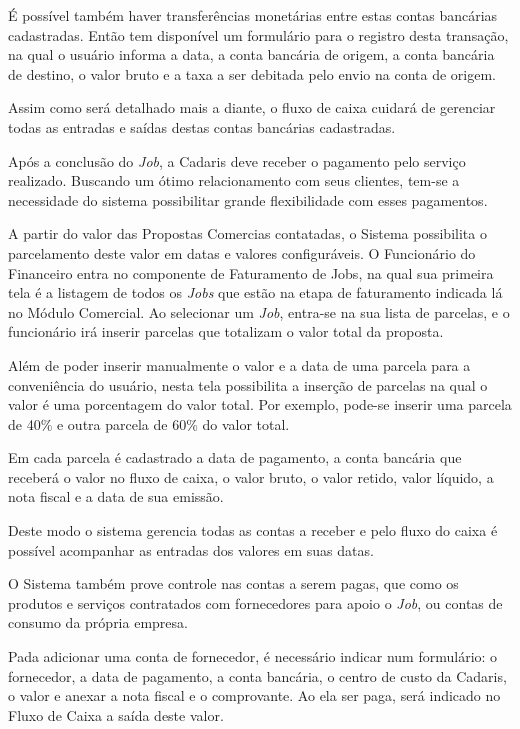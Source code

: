 \documentclass[
  12pt,				%
  openany,
  oneside,
  a4paper,			%
  english,			%
  brazil
]{article}
\numberwithin{figure}{section}
\numberwithin{table}{section}
\newcounter{subsubsubsection}[subsubsection]
\begin{document}
É possível também haver transferências monetárias entre estas contas bancárias cadastradas. Então tem disponível um formulário para o registro desta transação, na qual o usuário informa a data, a conta bancária de origem, a conta bancária de destino, o valor bruto e a taxa a ser debitada pelo envio na conta de origem.

Assim como será detalhado mais a diante, o fluxo de caixa cuidará de gerenciar todas as entradas e saídas destas contas bancárias cadastradas.



Após a conclusão do \textit{Job}, a Cadaris deve receber o pagamento pelo serviço realizado. Buscando um ótimo relacionamento com seus clientes, tem-se a necessidade do sistema possibilitar grande flexibilidade com esses pagamentos. 

A partir do valor das Propostas Comercias contatadas, o Sistema possibilita o parcelamento deste valor em datas e valores configuráveis. O Funcionário do Financeiro entra no componente de Faturamento de Jobs, na qual sua primeira tela é a listagem de todos os \textit{Jobs} que estão na etapa de faturamento indicada lá no Módulo Comercial. Ao selecionar um \textit{Job}, entra-se na sua lista de parcelas, e o funcionário irá inserir parcelas que totalizam o valor total da proposta. 

Além de poder inserir manualmente o valor e a data de uma parcela para a conveniência do usuário, nesta tela possibilita a inserção de parcelas na qual o valor é uma porcentagem do valor total. Por exemplo, pode-se inserir uma parcela de 40\% e outra parcela de 60\% do valor total.

Em cada parcela é cadastrado a data de pagamento, a conta bancária que receberá o valor no fluxo de caixa, o valor bruto, o valor retido, valor líquido, a nota fiscal e a data de sua emissão.

Deste modo o sistema gerencia todas as contas a receber e pelo fluxo do caixa é possível acompanhar as entradas dos valores em suas datas.



O Sistema também prove controle nas contas a serem pagas, que como os produtos e serviços contratados com fornecedores para apoio o \textit{Job}, ou contas de consumo da própria empresa.

Pada adicionar uma conta de fornecedor, é necessário indicar num formulário: o fornecedor, a data de pagamento, a conta bancária, o centro de custo da Cadaris, o valor e anexar a nota fiscal e o comprovante. Ao ela ser paga, será indicado no Fluxo de Caixa a saída deste valor.
\end{document}
